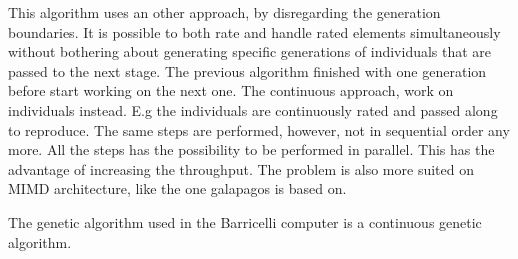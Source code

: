 This algorithm uses an other approach, by disregarding the generation boundaries. It is possible to both rate and handle rated elements simultaneously without bothering about generating specific generations of individuals that are passed to the next stage. The previous algorithm finished with one generation before start working on the next one. The continuous approach, work on individuals instead. E.g the individuals are continuously rated and passed along to reproduce. The same steps are performed, however, not in sequential order any more. All the steps has the possibility to be performed in parallel. This has the advantage of increasing the throughput. The problem is also more suited on MIMD architecture, like the one galapagos is based on.      





The genetic algorithm used in the Barricelli computer is a continuous genetic algorithm.


